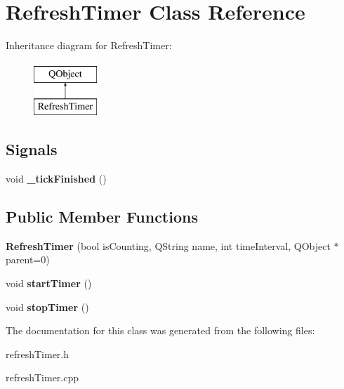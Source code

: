 \hypertarget{class_refresh_timer}{}\section{Refresh\+Timer Class Reference}
\label{class_refresh_timer}
Inheritance diagram for Refresh\+Timer\+:\begin{figure}[H]
\begin{center}
\leavevmode
\includegraphics[height=2.000000cm]{class_refresh_timer}
\end{center}
\end{figure}
\subsection*{Signals}
\begin{DoxyCompactItemize}
\item 
\mbox{\label{class_refresh_timer_adead57c7677cc89c54a2c256fbbb0cba}} 
void {\bfseries \+\_\+tick\+Finished} ()
\end{DoxyCompactItemize}
\subsection*{Public Member Functions}
\begin{DoxyCompactItemize}
\item 
\mbox{\label{class_refresh_timer_a122b70f1528d06683f8c09358fcac479}} 
{\bfseries Refresh\+Timer} (bool is\+Counting, Q\+String name, int time\+Interval, Q\+Object $\ast$parent=0)
\item 
\mbox{\label{class_refresh_timer_ab4473c0ed5ef0f7de787825cc7a8ca66}} 
void {\bfseries start\+Timer} ()
\item 
\mbox{\label{class_refresh_timer_a84cab7be9da9bc32782378d346700da1}} 
void {\bfseries stop\+Timer} ()
\end{DoxyCompactItemize}


The documentation for this class was generated from the following files\+:\begin{DoxyCompactItemize}
\item 
refresh\+Timer.\+h\item 
refresh\+Timer.\+cpp\end{DoxyCompactItemize}
